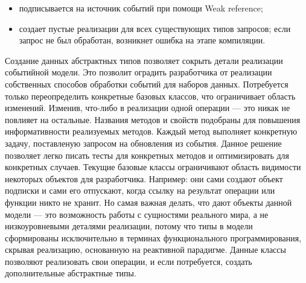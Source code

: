 \begin{itemize}
  \item подписывается на источник событий при помощи Weak reference;
  \item создает пустые реализации для всех существующих типов запросов; если запрос не был обработан, возникнет ошибка на этапе компиляции.
\end{itemize}

Создание данных абстрактных типов позволяет сокрыть детали реализации событийной модели. Это позволит оградить разработчика от реализации собственных способов обработки
событий для наборов данных. Потребуется только переопределить конкретные базовых классов, что ограничивает область изменений.
Изменив, что-либо в реализации одной операции --- это никак не повлияет на остальные. Названия методов и свойств подобраны для повышения информативности реализуемых методов.
Каждый метод выполняет конкретную задачу, поставленую запросом на обновления из события. Данное решение позволяет легко писать тесты для конкретных методов и оптимизировать для
конкретных случаев. Текущие базовые классы ограничивают область видимости некоторых объектов для разработчика. Например: они сами создают объект подписки и сами его отпускают, когда
ссылку на результат операции или функции никто не хранит. Но самая важная делать, что дают объекты данной модели --- это возможность работы с сущностями реального мира,
а не низкоуровневыми деталями реализации, потому что типы в модели сформированы исключительно в терминах функционального программирования, скрывая реализацию, основанную на реактивной парадигме.
Данные классы позволяют реализовать свои операции, и если потребуется, создать дополнительные абстрактные типы.
